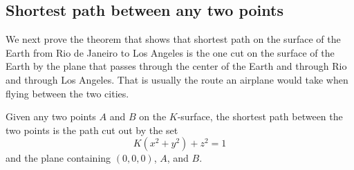 \documentclass[newpage,hints,handout,noauthor,nooutcomes,12pt]{ximera}
\begin{document}
\subsection{Shortest path between any two points}

We next prove the theorem that shows that shortest path on the surface
of the Earth from Rio de Janeiro to Los Angeles is the one cut on the
surface of the Earth by the plane that passes through the center of
the Earth and through Rio and through Los Angeles. That is usually the
route an airplane would take when flying between the two cities.


\begin{theorem}
Given any two points $A$ and $B$ on the $K$-surface, the shortest path
between the two points is the path cut out by the set
\[
K\left(  x^{2}+y^{2}\right)  +z^{2}=1
\]
and the plane containing $(0,0,0)$, $A$, and $B$.
\end{theorem}
\end{document}

